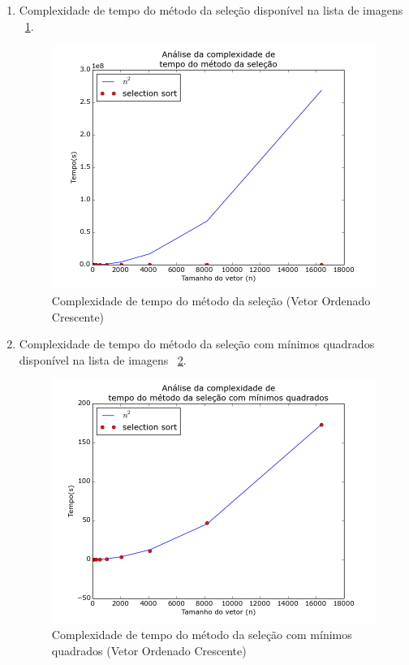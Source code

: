 \documentclass[12pt,a4paper,twoside]{report}
\begin{document}
\begin{enumerate}
\begin{enumerate}
			\item Complexidade de tempo do método da seleção disponível na lista de imagens ~\ref{fig:SelectionPlot2OC}.
			\begin{figure}[!h]
				\centering
				\includegraphics[scale=0.6]{../imagens/Selection/selection_plot_2_ordenado_crescente.png}
				\caption{Complexidade de tempo do método da seleção (Vetor Ordenado Crescente) \label{fig:SelectionPlot2OC}}
			\end{figure}


			\item Complexidade de tempo do método da seleção com mínimos quadrados disponível na lista de imagens ~\ref{fig:SelectionPlot3OC}.
			\begin{figure}[!h]
				\centering
				\includegraphics[scale=0.6]{../imagens/Selection/selection_plot_3_ordenado_crescente.png}
				\caption{Complexidade de tempo do método da seleção com mínimos quadrados (Vetor Ordenado Crescente) \label{fig:SelectionPlot3OC}}
			\end{figure}


\end{enumerate}
\end{enumerate}
\end{document}
